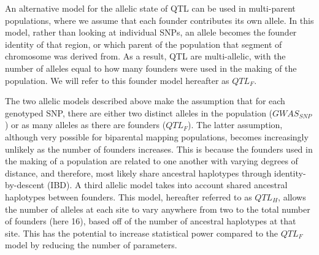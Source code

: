 \documentclass[article,9pt,twocolumn,twoside]{rilabRxiv}
\newcommand{\jri}[1]{{\small \textcolor{red}{#1}}}
\newcommand{\der}{{\textcolor{purple}{X}}}
\begin{document}
An alternative model for the allelic state of QTL can be used in multi-parent populations, where we assume that each founder contributes its own allele.
In this model, rather than looking at individual SNPs, an allele becomes the founder identity of that region, or which parent of the population that segment of chromosome was derived from.
As a result, QTL are multi-allelic, with the number of alleles equal to how many founders were used in the making of the population.
We will refer to this founder model hereafter as $QTL_F$.



The two allelic models described above make the assumption that for each genotyped SNP, there are either two distinct alleles in the population ($GWAS_{SNP}$) or as many alleles as there are founders ($QTL_F$).
The latter assumption, although very possible for biparental mapping populations, becomes increasingly unlikely as the number of founders increases.
This is because the founders used in the making of a population are related to one another with varying degrees of distance, and therefore, most likely share ancestral haplotypes through identity-by-descent (IBD).
A third allelic model takes into account shared ancestral haplotypes between founders.
This model, hereafter referred to as $QTL_H$, allows the number of alleles at each site to vary anywhere from two to the total number of founders (here 16), based off of the number of ancestral haplotypes at that site.
This has the potential to increase statistical power compared to the $QTL_F$ model by reducing the number of parameters.
\end{document}
